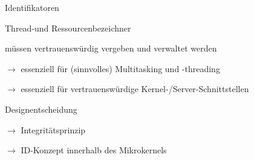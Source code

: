 \documentclass[a4paper]{article}
\begin{document}
\begin{multicols}{3}
    Identifikatoren
    \begin{itemize*}
        \item Thread-und Ressourcenbezeichner
        \begin{itemize*}
            \item müssen vertrauenswürdig vergeben und verwaltet werden
            \item[$\rightarrow$] essenziell für (sinnvolles) Multitasking und -threading
            \item[$\rightarrow$] essenziell für vertrauenswürdige Kernel-/Server-Schnittstellen
        \end{itemize*}
        \item Designentscheidung
        \begin{itemize*}
            \item[$\rightarrow$] Integritätsprinzip
            \item[$\rightarrow$] ID-Konzept innerhalb des Mikrokernels
        \end{itemize*}
    \end{itemize*}


\end{multicols}
\end{document}
